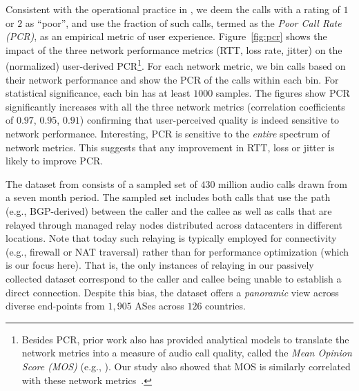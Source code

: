 Consistent with the operational practice in \skype, we deem 
the calls with a rating of $1$ or $2$ as ``poor'', and use the 
fraction of such calls, termed as the {\em Poor Call Rate (PCR)}, 
as an empirical metric of user experience. 
Figure~\ref{fig:pcr} shows the impact of the three network 
performance metrics (RTT, loss rate, jitter) on the (normalized)
user-derived PCR\footnote{Besides PCR, 
prior work also has provided analytical models to 
translate the network metrics into a measure of audio call quality, 
called the {\em Mean Opinion Score (MOS)} (e.g., \cite{cole}). 
Our study also showed that MOS is similarly correlated with
these network metrics~\cite{via}.}. 
For each network metric, we bin calls based on their 
network performance and show the PCR of the calls within 
each bin. 
For statistical significance, each bin has at least $1000$ samples. 
The figures show PCR significantly increases with all the three 
network metrics (correlation coefficients of $0.97$, $0.95$, $0.91$) 
confirming that user-perceived quality is indeed sensitive to 
network performance.
Interesting, PCR is sensitive to the {\em entire} spectrum of 
network metrics. This suggests that any improvement in RTT, 
loss or jitter is likely to improve PCR.


The dataset from \skype consists of a sampled set of $430$ 
million audio calls drawn from a seven month period. 
The sampled set includes both calls that use the 
\direct path (e.g., BGP-derived) between the caller 
and the callee %
as well as calls that are relayed through managed 
relay nodes distributed across datacenters in different 
locations. %
Note that today such relaying is typically employed for 
connectivity (e.g., firewall or NAT traversal) rather than 
for performance optimization (which is our focus here).
That is, the only instances of relaying in our passively 
collected dataset correspond to the caller and callee being 
unable to establish a direct connection. 
Despite this bias, the dataset offers a {\em panoramic} view 
across diverse end-points from $1,905$ ASes across $126$ 
countries. 




